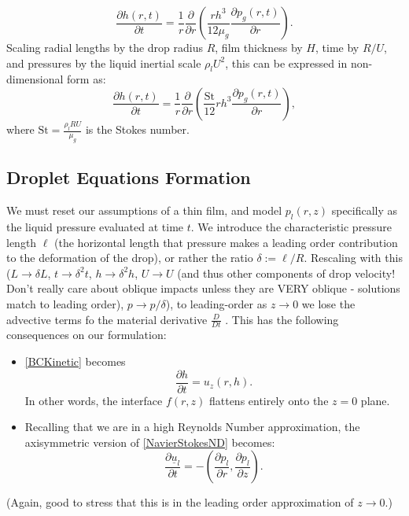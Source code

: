 \documentclass[11pt,a4paper]{article}
\begin{document}
	\begin{equation}
		\frac{\partial h(r,t)}{\partial t} = \frac{1}{r}\frac{\partial }{\partial r}\left( \frac{rh^3}{12\mu_g} \frac{\partial p_g(r,t)}{\partial r} \right).
	\end{equation}
	Scaling radial lengths by the drop radius $R$, film thickness by $H$, time by $R/U$, and pressures by the liquid inertial scale $\rho_l U^2$, this can be expressed in non-dimensional form as:
	\begin{equation}\label{LubricationND}
		\frac{\partial h(r,t)}{\partial t} = \frac{1}{r}\frac{\partial }{\partial r}\left( \frac{\text{St}}{12} rh^3 \frac{\partial p_g(r,t)}{\partial r} \right),
	\end{equation}
	where $\text{St} = \frac{\rho_l R U}{\mu_g}$ is the Stokes number.
	
	
	
	
	\subsection{Droplet Equations Formation}
	We must reset our assumptions of a thin film, and model $p_l(r,z)$ specifically as the liquid pressure evaluated at time $t$.
	We introduce the characteristic pressure length $\ell$ (the horizontal length that pressure makes a leading order contribution to the deformation of the drop), or rather the ratio $\delta := \ell/R$. Rescaling with this ($L \to \delta L$, $t \to \delta^2t$, $h \to \delta^2h$, $U \to U$ (and thus other components of drop velocity! Don't really care about oblique impacts unless they are VERY oblique - solutions match to leading order), $p \to p/\delta$), to leading-order as $z \to 0$ we lose the advective terms fo the material derivative $\frac{D}{Dt}$ . This has the following consequences on our formulation:
	\begin{itemize}
		\item \eqref{BCKinetic} becomes
		\begin{equation}
			\label{KineticApprox}
			\frac{\partial h}{\partial t} = u_z(r, h).
		\end{equation}
		In other words, the interface $f(r,z)$ flattens entirely onto the $z=0$ plane.
		\item Recalling that we are in a high Reynolds Number approximation, the axisymmetric version of \eqref{NavierStokesND} becomes:
		\begin{equation}
			\label{NSHarmonic}
			\frac{\partial \underline{u}_l}{\partial t} = -\left( \frac{\partial p_l}{\partial r}, \frac{\partial p_l}{\partial z} \right).
		\end{equation}
	\end{itemize}
	(Again, good to stress that this is in the leading order approximation of $z \to 0$.)
	
\end{document}
